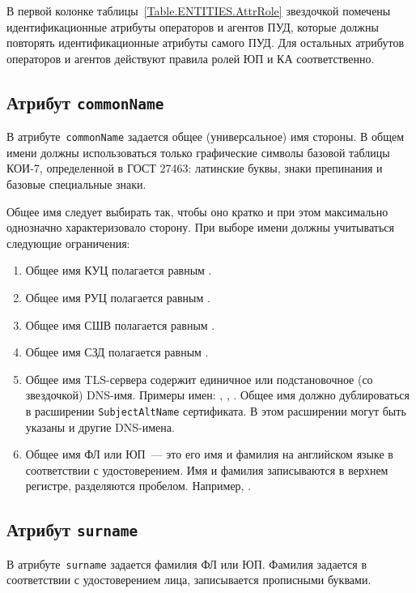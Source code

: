 В первой колонке таблицы~\ref{Table.ENTITIES.AttrRole}
звездочкой помечены идентификационные атрибуты операторов и агентов ПУД,
которые должны повторять идентификационные атрибуты самого ПУД. 
Для остальных атрибутов операторов и агентов действуют правила ролей ЮП и 
КА соответственно. 

\subsection{Атрибут \texttt{commonName}}\label{ENTITIES.Id.CN}

В атрибуте~\texttt{commonName} задается общее (универсальное) имя стороны.
В общем имени должны использоваться только графические символы базовой 
таблицы КОИ-7, определенной в ГОСТ 27463: латинские буквы, 
знаки препинания и базовые специальные знаки.
 
Общее имя следует выбирать так, чтобы оно кратко 
и при этом максимально однозначно характеризовало сторону. 
При выборе имени должны учитываться следующие ограничения:
\begin{enumerate}
\item
Общее имя КУЦ полагается равным .
\item
Общее имя РУЦ полагается равным .
\item
Общее имя СШВ полагается равным .
\item
Общее имя СЗД полагается равным .
\item
Общее имя TLS-сервера содержит единичное или подстановочное (со звездочкой) 
DNS-имя. Примеры имен: , , .
%
Общее имя должно дублироваться в расширении \texttt{SubjectAltName} 
сертификата. В этом расширении могут быть указаны и другие DNS-имена.
\item
Общее имя ФЛ или ЮП~--- это его имя и фамилия на английском языке в 
соответствии с удостоверением.
Имя и фамилия записываются в верхнем регистре, разделяются пробелом.
Например, .
\end{enumerate}

\subsection{Атрибут \texttt{surname}}\label{ENTITIES.Id.S}

В атрибуте~\texttt{surname} задается фамилия ФЛ или ЮП.
Фамилия задается в соответствии с удостоверением лица,
записывается прописными буквами.

